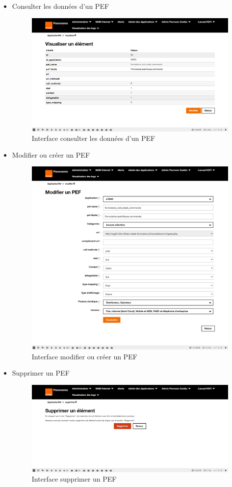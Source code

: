 \begin{itemize}
	\item Consulter les données d'un PEF
	\begin{figure}[H]
		\centering
		\includegraphics[width=0.55\linewidth]{img/screenshots/pef/view}
		\caption[Interface voir les données d'un PEF]{Interface consulter les données d'un PEF}
		\label{fig:view-pef}
	\end{figure}
	\newpage
	\item Modifier ou créer un PEF
	\begin{figure}[H]
		\centering
		\includegraphics[width=0.7\linewidth]{img/screenshots/pef/edit}
		\caption[Interface modifier ou créer un PEF]{Interface modifier ou créer un PEF}
		\label{fig:create-pef}
	\end{figure}
	
	\item Supprimer un PEF
	\begin{figure}[H]
		\centering
		\includegraphics[width=0.7\linewidth]{img/screenshots/pef/delete}
		\caption[Interface supprimer un PEF]{Interface supprimer un PEF}
		\label{fig:delete-pef}
	\end{figure}
\end{itemize}
\newpage
